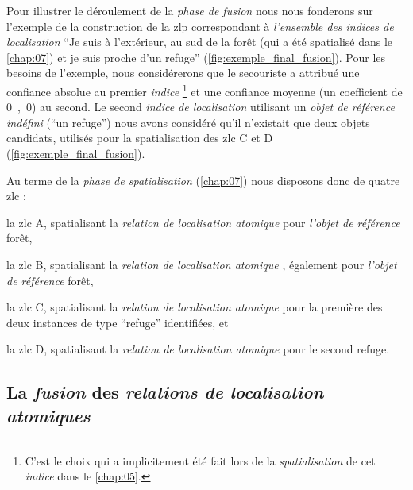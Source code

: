 Pour illustrer le déroulement de la \emph{phase de fusion} nous nous
fonderons sur l'exemple de la construction de la \ac{zlp}
correspondant à \emph{l'ensemble des indices de localisation}
\enquote{Je suis à l'extérieur, au sud de la forêt (qui a été
  spatialisé dans le \autoref{chap:07}) et je suis proche d'un refuge}
(\autoref{fig:exemple_final_fusion}). Pour les besoins de l'exemple,
nous considérerons que le secouriste a attribué une confiance absolue
au premier \emph{indice} \footnote{C'est le choix qui a implicitement
  été fait lors de la \emph{spatialisation} de cet \emph{indice} dans
  le \autoref{chap:05}.} et une confiance moyenne (\ie un coefficient
de \si{0,0}) au second. Le second \emph{indice de localisation}
utilisant un \emph{objet de référence indéfini} (\eg \enquote{un
  refuge}) nous avons considéré qu'il n'existait que deux objets
candidats, utilisés pour la spatialisation des \ac{zlc}
\textcolor{RdBu-9-8}{\textsf{C}} et \textcolor{RdBu-9-9}{\textsf{D}}
(\autoref{fig:exemple_final_fusion}).

Au terme de la \emph{phase de spatialisation} (\autoref{chap:07}) nous
disposons donc de quatre \ac{zlc} :
% 
\begin{enumerate*}[label=(\arabic*)]
\item la \ac{zlc} \textcolor{RdBu-9-1}{\textsf{A}}, spatialisant la
  \emph{relation de localisation atomique}  pour
  \emph{l'objet de référence} forêt,
\item la \ac{zlc} \textcolor{RdBu-9-2}{\textsf{B}}, spatialisant la
  \emph{relation de localisation atomique} ,
  également pour \emph{l'objet de référence} forêt,
\item la \ac{zlc} \textcolor{RdBu-9-8}{\textsf{C}}, spatialisant la
  \emph{relation de localisation atomique}  pour
  la première des deux instances de type \enquote{refuge} identifiées,
  et
\item la \ac{zlc} \textcolor{RdBu-9-9}{\textsf{D}}, spatialisant la
  \emph{relation de localisation atomique}  pour
  le second refuge.
\end{enumerate*}

\subsection{La \emph{fusion} des \emph{relations de localisation
    atomiques}}

